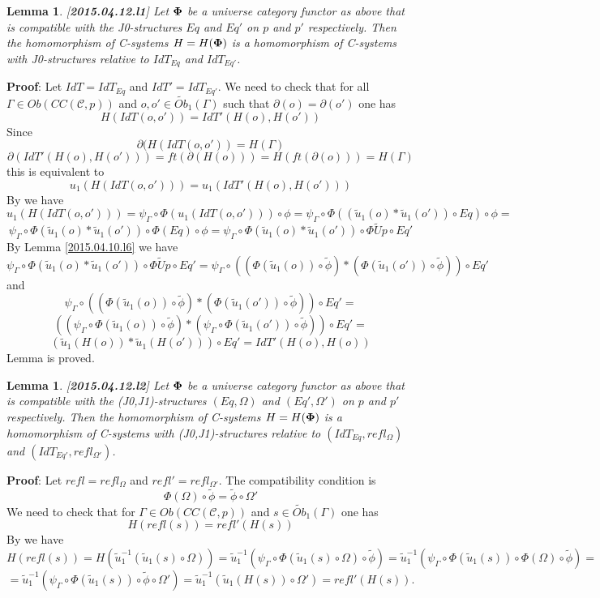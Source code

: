 \documentclass[12pt]{article}
\newenvironment{myproof}{{\bf Proof}:}{\vskip 5mm }
\newtheorem{lemma}[proposition]{Lemma}
\newcommand{\llabel}[1]{\label{#1}[{\bf #1}]}
\newcommand{\wt}{\widetilde}
\begin{document}
\begin{lemma}
\llabel{2015.04.12.l1}
Let ${\bf\Phi}$ be a universe category functor as above that is compatible with the J0-structures $Eq$ and $Eq'$ on $p$ and $p'$ respectively. Then the homomorphism of C-systems $H=H({\bf\Phi})$ is a homomorphism of C-systems with J0-structures relative to $IdT_{Eq}$ and $IdT_{Eq'}$.
\end{lemma}
%
\begin{myproof}
Let $IdT=IdT_{Eq}$ and $IdT'=IdT_{Eq'}$. We need to check that for all $\Gamma\in Ob(CC({\mathcal C},p))$ and $o,o'\in \wt{Ob}_1(\Gamma)$ such that $\partial(o)=\partial(o')$ one has
%
$$H(IdT(o,o'))=IdT'(H(o),H(o'))$$
%
Since 
%
$$\partial(H(IdT(o,o'))=H(\Gamma)$$
%
$$\partial(IdT'(H(o),H(o')))=ft(\partial(H(o)))=H(ft(\partial(o)))=H(\Gamma)$$
%
this is equivalent to
%
$$u_1(H(IdT(o,o')))=u_1(IdT'(H(o),H(o')))$$
%
By \cite[Lemma 6.1(1)]{fromunivwithPi} we have
%
$$u_1(H(IdT(o,o')))=\psi_{\Gamma}\circ\Phi(u_1(IdT(o,o')))\circ\phi=\psi_{\Gamma}\circ\Phi((\wt{u}_1(o)*\wt{u}_1(o'))\circ Eq)\circ\phi=$$
%
$$\psi_{\Gamma}\circ\Phi(\wt{u}_1(o)*\wt{u}_1(o'))\circ \Phi(Eq)\circ\phi=\psi_{\Gamma}\circ\Phi(\wt{u}_1(o)*\wt{u}_1(o'))\circ \Phi\wt{U}p\circ Eq'$$
%
By Lemma \ref{2015.04.10.l6} we have 
%
$$\psi_{\Gamma}\circ\Phi(\wt{u}_1(o)*\wt{u}_1(o'))\circ \Phi\wt{U}p\circ Eq'=\psi_{\Gamma}\circ((\Phi(\wt{u}_1(o))\circ\wt{\phi})*(\Phi(\wt{u}_1(o'))\circ\wt{\phi}))\circ Eq'$$
%
and \cite[Lemma 6.1(2)]{fromunivwithPi}
%
$$\psi_{\Gamma}\circ((\Phi(\wt{u}_1(o))\circ\wt{\phi})*(\Phi(\wt{u}_1(o'))\circ\wt{\phi}))\circ Eq'=$$
$$((\psi_{\Gamma}\circ\Phi(\wt{u}_1(o))\circ\wt{\phi})*(\psi_{\Gamma}\circ\Phi(\wt{u}_1(o'))\circ\wt{\phi}))\circ Eq'=$$
$$(\wt{u}_1(H(o))*\wt{u}_1(H(o')))\circ Eq'=IdT'(H(o),H(o))$$
%
Lemma is proved.
\end{myproof}
%
\begin{lemma}
\llabel{2015.04.12.l2}
Let ${\bf\Phi}$ be a universe category functor as above that is compatible with the (J0,J1)-structures $(Eq,\Omega)$ and $(Eq',\Omega')$ on $p$ and $p'$ respectively. Then the homomorphism of C-systems $H=H({\bf\Phi})$ is a homomorphism of C-systems with (J0,J1)-structures relative to $(IdT_{Eq},refl_{\Omega})$ and $(IdT_{Eq'},refl_{\Omega'})$.
\end{lemma}
%
\begin{myproof}
Let $refl=refl_{\Omega}$ and $refl'=refl_{\Omega'}$. The compatibility condition is
%
$$\Phi(\Omega)\circ\wt{\phi}=\wt{\phi}\circ\Omega'$$
%
We need to check that for $\Gamma\in Ob(CC({\mathcal C},p))$ and $s\in \wt{Ob}_1(\Gamma)$ one has
%
$$H(refl(s))=refl'(H(s))$$
%
By \cite[Lemma 6.1(2)]{fromunivwithPi} we have
%
$$H(refl(s))=H(\wt{u}_1^{-1}(\wt{u}_1(s)\circ\Omega))=\wt{u}_1^{-1}(\psi_{\Gamma}\circ\Phi(\wt{u}_1(s)\circ\Omega)\circ\wt{\phi})=\wt{u}_1^{-1}(\psi_{\Gamma}\circ\Phi(\wt{u}_1(s))\circ\Phi(\Omega)\circ \wt{\phi})=$$
$$=\wt{u}_1^{-1}(\psi_{\Gamma}\circ\Phi(\wt{u}_1(s))\circ\wt{\phi}\circ\Omega')=\wt{u}_1^{-1}(\wt{u}_1(H(s))\circ\Omega')=refl'(H(s)).$$
\end{myproof}
%
\end{document}
